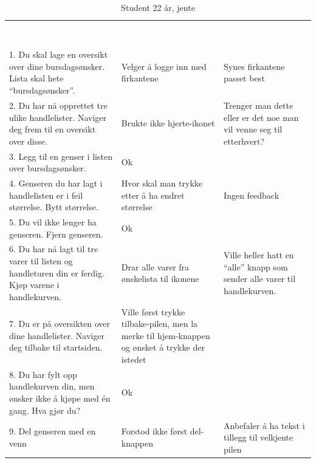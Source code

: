 \begin{table}[H]
    \caption{Student 22 år, jente}
    \label{tab:observasjon2_3}
    \centering
    \begin{tabular}{L{15em}  L{15em} L{15em}}
        \textbf{\textcolor{white}{Task}} & \textbf{\textcolor{white}{Obeservation during execution}} & \textbf{\textcolor{white}{Conversation and discussion}}\\
        1. Du skal lage en oversikt over dine bursdagsønsker. Lista skal hete “bursdagsønsker”. & Velger å logge inn med firkantene & Synes firkantene passet best\\
        2. Du har nå opprettet tre ulike handlelister. Naviger deg frem til en oversikt over disse. & Brukte ikke hjerte-ikonet & Trenger man dette eller er det noe man vil venne seg til etterhvert? \\
        3. Legg til en genser i listen over bursdagsønsker. & Ok & \\ 
        4. Genseren du har lagt i handlelisten er i feil størrelse. Bytt størrelse. & Hvor skal man trykke etter å ha endret størrelse & Ingen feedback\\
        5. Du vil ikke lenger ha genseren. Fjern genseren. & Ok & \\
        6. Du har nå lagt til tre varer til listen og handleturen din er ferdig. Kjøp varene i handlekurven. & Drar alle varer fra ønskelista til ikonene & Ville heller hatt en “alle” knapp som sender alle varer til handlekurven.\\
        7. Du er på oversikten over dine handlelister. Naviger deg tilbake til startsiden. & Ville først trykke tilbake-pilen, men la merke til hjem-knappen og ønsket å trykke der istedet & \\
        8. Du har fylt opp handlekurven din, men ønsker ikke å kjøpe med én gang. Hva gjør du? & Ok & \\
        9. Del genseren med en venn & Forstod ikke først del-knappen & Anbefaler å ha tekst i tillegg til velkjente pilen\\
    \end{tabular}
\end{table}
